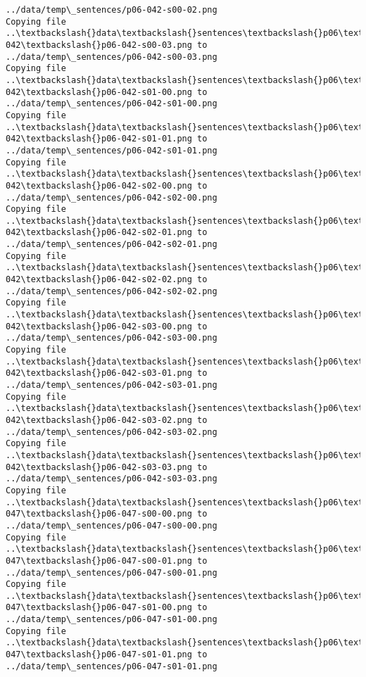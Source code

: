 \documentclass[11pt]{article}
\begin{document}
\begin{Verbatim}[commandchars=\\\{\}]
../data/temp\_sentences/p06-042-s00-02.png
Copying file ..\textbackslash{}data\textbackslash{}sentences\textbackslash{}p06\textbackslash{}p06-042\textbackslash{}p06-042-s00-03.png to
../data/temp\_sentences/p06-042-s00-03.png
Copying file ..\textbackslash{}data\textbackslash{}sentences\textbackslash{}p06\textbackslash{}p06-042\textbackslash{}p06-042-s01-00.png to
../data/temp\_sentences/p06-042-s01-00.png
Copying file ..\textbackslash{}data\textbackslash{}sentences\textbackslash{}p06\textbackslash{}p06-042\textbackslash{}p06-042-s01-01.png to
../data/temp\_sentences/p06-042-s01-01.png
Copying file ..\textbackslash{}data\textbackslash{}sentences\textbackslash{}p06\textbackslash{}p06-042\textbackslash{}p06-042-s02-00.png to
../data/temp\_sentences/p06-042-s02-00.png
Copying file ..\textbackslash{}data\textbackslash{}sentences\textbackslash{}p06\textbackslash{}p06-042\textbackslash{}p06-042-s02-01.png to
../data/temp\_sentences/p06-042-s02-01.png
Copying file ..\textbackslash{}data\textbackslash{}sentences\textbackslash{}p06\textbackslash{}p06-042\textbackslash{}p06-042-s02-02.png to
../data/temp\_sentences/p06-042-s02-02.png
Copying file ..\textbackslash{}data\textbackslash{}sentences\textbackslash{}p06\textbackslash{}p06-042\textbackslash{}p06-042-s03-00.png to
../data/temp\_sentences/p06-042-s03-00.png
Copying file ..\textbackslash{}data\textbackslash{}sentences\textbackslash{}p06\textbackslash{}p06-042\textbackslash{}p06-042-s03-01.png to
../data/temp\_sentences/p06-042-s03-01.png
Copying file ..\textbackslash{}data\textbackslash{}sentences\textbackslash{}p06\textbackslash{}p06-042\textbackslash{}p06-042-s03-02.png to
../data/temp\_sentences/p06-042-s03-02.png
Copying file ..\textbackslash{}data\textbackslash{}sentences\textbackslash{}p06\textbackslash{}p06-042\textbackslash{}p06-042-s03-03.png to
../data/temp\_sentences/p06-042-s03-03.png
Copying file ..\textbackslash{}data\textbackslash{}sentences\textbackslash{}p06\textbackslash{}p06-047\textbackslash{}p06-047-s00-00.png to
../data/temp\_sentences/p06-047-s00-00.png
Copying file ..\textbackslash{}data\textbackslash{}sentences\textbackslash{}p06\textbackslash{}p06-047\textbackslash{}p06-047-s00-01.png to
../data/temp\_sentences/p06-047-s00-01.png
Copying file ..\textbackslash{}data\textbackslash{}sentences\textbackslash{}p06\textbackslash{}p06-047\textbackslash{}p06-047-s01-00.png to
../data/temp\_sentences/p06-047-s01-00.png
Copying file ..\textbackslash{}data\textbackslash{}sentences\textbackslash{}p06\textbackslash{}p06-047\textbackslash{}p06-047-s01-01.png to
../data/temp\_sentences/p06-047-s01-01.png

\end{Verbatim}
\end{document}
